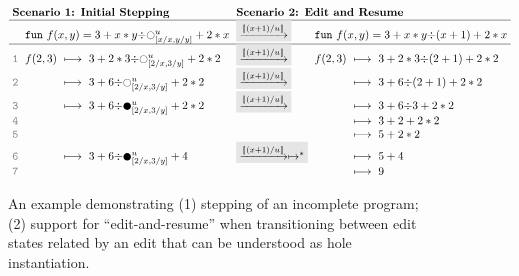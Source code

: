 \newcommand{\linenumber}[1]{{\color{gray} \texttt{#1}}}
\begin{figure}[ht]
\vspace{-5px}
\center
\small
\ensuremath{
\arraycolsep=3pt
\begin{array}{rrclcrcl}
\multicolumn{4}{l}{\textbf{Scenario 1: Initial Stepping}}
&
\multicolumn{4}{l}{\textbf{Scenario 2: Edit and Resume}}
\\
\hline
&
\multicolumn{3}{l}{\texttt{fun}~f(x,y) = 3 + x * y {\div} \hehole{\metavar}_{[x/x,y/y]} + 2 * x}
&
\multicolumn{1}{l}{
\colorbox{dVeryFaint}{$\xrightarrow{[\!| (x+1) / u |\!]}$}
}
&
\multicolumn{3}{l}{\texttt{fun}~f(x,y) = 3 + x * y {\div} (x+1) + 2 * x}
\\
\hline
\linenumber{1} & 
f(2,3) &\longmapsto & 3 + 2 * 3 {\div} \hehole{\metavar}_{[2/x, 3/y]}  + 2 * 2
&
\multicolumn{1}{l}{
\colorbox{dVeryFaint}{$\xrightarrow{[\!| (x+1) / u |\!]}$}
} 
&
f(2,3) &{\longmapsto} & {3 + 2 * 3 {\div} (2+1) + 2 * 2}
\\
\linenumber{2} & 
&\longmapsto& 3 + 6 {\div} \hehole{\metavar}_{[2/x, 3/y]} + 2 * 2
&
\multicolumn{1}{l}{
\colorbox{dVeryFaint}{$\xrightarrow{[\!| (x+1) / u |\!]}$}
}
&& {\longmapsto} & {3 + 6 {\div} (2 + 1) + 2 * 2}
\\
\linenumber{3} &
&\longmapsto & 3 + 6 {\div} \heholechk{\metavar}_{[2/x, 3/y]} + 2 * 2
&\multicolumn{1}{l}{
\colorbox{dVeryFaint}{$\xrightarrow{[\!| (x+1) / u |\!]}$}
}
&& \longmapsto& {3 + 6 {\div} 3 + 2 * 2}
\\
\linenumber{4} &
&&
&&& \longmapsto& 3 + 2 + 2 * 2
\\
\linenumber{5} &
&&
&&& \longmapsto & 5 + 2 * 2
\\
\linenumber{6} &
& \longmapsto &3 + 6 {\div} \heholechk{\metavar}_{[2/x, 3/y]} + 4 
&
\multicolumn{1}{l}{
\colorbox{dVeryFaint}{$\xrightarrow{[\!| (x+1) / u |\!]}\mapsto^{*}$}
}
&& \longmapsto & 5 + 4
\\
\linenumber{7} &
&& 
&&& \longmapsto & 9
\end{array}
}
\vspace{-5px}
\caption{An example demonstrating (1) stepping of an incomplete program; (2) support for ``edit-and-resume'' when transitioning between edit states related by an edit that can be understood as hole instantiation.}
\vspace{-5px}
\label{fig:dynamics}
\end{figure}

